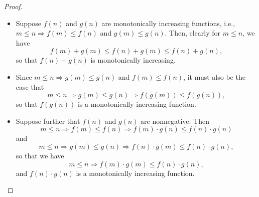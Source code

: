 \begin{proof}
  \begin{itemize}
    \item[\textbf{a.}] Suppose $f(n)$ and $g(n)$ are monotonically increasing
      functions, i.e., $m \leq n \Rightarrow f(m) \leq f(n)$ and
      $g(m) \leq g(n)$. Then, clearly for $m \leq n$, we have
      \[
        f(m) + g(m) \leq f(n) + g(m) \leq f(n) + g(n),
      \]
      so that $f(n) + g(n)$ is monotonically increasing.
    \item[\textbf{b.}] Since $m \leq n \Rightarrow g(m) \leq g(n)$ and
      $f(m) \leq f(n)$, it must also be the case that
      \[
        m \leq n \Rightarrow g(m) \leq g(n) \Rightarrow f(g(m)) \leq f(g(n)),
      \]
      so that $f(g(n))$ is a monotonically increasing function.
    \item[\textbf{c.}] Suppose further that $f(n)$ and $g(n)$ are nonnegative.
      Then
      \[
        m \leq n \Rightarrow f(m) \leq f(n) \Rightarrow f(m) \cdot g(n)
        \leq f(n) \cdot g(n)
      \]
      and
      \[
        m \leq n \Rightarrow g(m) \leq g(n) \Rightarrow f(n) \cdot g(m)
        \leq f(n) \cdot g(n),
      \]
      so that we have
      \[
        m \leq n \Rightarrow f(m) \cdot g(m) \leq f(n) \cdot g(n),
      \]
      and $f(n) \cdot g(n)$ is a monotonically increasing function.
  \end{itemize}
\end{proof}
